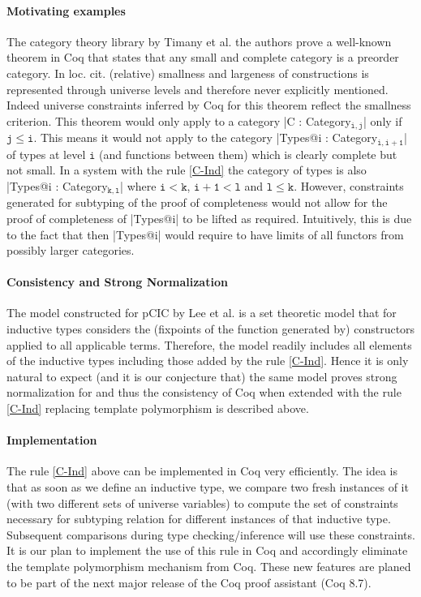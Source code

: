 \documentclass{easychair}
\begin{document}
\paragraph{Motivating examples}
The category theory library by Timany et
al. \cite{DBLP:conf/rta/Timany016} the authors prove a well-known
theorem in Coq that states that any small and complete category is a
preorder category.  In loc. cit. (relative) smallness and largeness of
constructions is represented through universe levels and therefore
never explicitly mentioned.  Indeed universe constraints inferred by
Coq for this theorem reflect the smallness criterion. This theorem
would only apply to a category \Coqe|C : Category$_{\mathtt{i, j}}$|
only if $\mathtt{j \le i}$. This means it would not apply to the
category \Coqe|Types@{i} : Category$_{\mathtt{i, i + 1}}$| of types at
level $\mathtt{i}$ (and functions between them) which is clearly
complete but not small.
In a system with the rule \ref{C-Ind} the category of types is also
\Coqe|Types@{i} : Category$_{\mathtt{k, l}}$| where $\mathtt{i < k}$,
$\mathtt{i + 1 < l}$ and $\mathtt{l \le k}$. However, constraints
generated for subtyping of the proof of completeness would not allow
for the proof of completeness of \Coqe|Types@{i}| to be lifted as
required. Intuitively, this is due to the fact that then
\Coqe|Types@{i}| would require to have limits of all functors from
possibly larger categories.

\paragraph{Consistency and Strong Normalization}
The model constructed for pCIC by Lee et
al. \cite{DBLP:journals/corr/abs-1111-0123} is a set theoretic model
that for inductive types considers the (fixpoints of the function
generated by) constructors applied to all applicable terms. Therefore,
the model readily includes all elements of the inductive types
including those added by the rule \ref{C-Ind}. Hence it is only
natural to expect (and it is our conjecture that) the same model
proves strong normalization for and thus the consistency of Coq when
extended with the rule \ref{C-Ind} replacing template polymorphism is
described above.


\paragraph{Implementation}
The rule \ref{C-Ind} above can be implemented in Coq very efficiently.
The idea is that as soon as we define an inductive type, we compare
two fresh instances of it (with two different sets of universe
variables) to compute the set of constraints necessary for subtyping
relation for different instances of that inductive type. Subsequent
comparisons during type checking/inference will use these constraints.
It is our plan to implement the use of this rule in Coq and
accordingly eliminate the template polymorphism mechanism from Coq.
These new features are planed to be part of the next major release of
the Coq proof assistant (Coq 8.7).

\setlength{\bibsep}{0pt} %
\renewcommand{\bibfont}{\small} %


\end{document}
